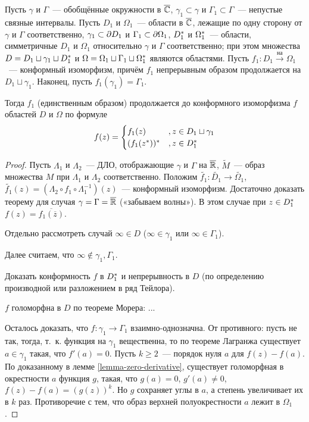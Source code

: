 \section{}
\begin{theorem}
	Пусть $\gamma$ и $\Gamma$ — обобщённые окружности в $\overline{\mathbb C}$, $\gamma_1 \subset \gamma$ и $\Gamma_1 \subset \Gamma$ — непустые связные интервалы. Пусть $D_1$ и $\Omega_1$ — области в $\overline{\mathbb C}$, лежащие по одну сторону от $\gamma$ и $\Gamma$ соответственно, $\gamma_1 \subset \partial D_1$ и $\Gamma_1 \subset \partial \Omega_1$, $D_1^*$ и $\Omega_1^*$ — области, симметричные $D_1$ и $\Omega_1$ относительно $\gamma$ и $\Gamma$ соответственно; при этом множества $D = D_1 \sqcup \gamma_1 \sqcup D_1^*$ и $\Omega = \Omega_1 \sqcup \Gamma_1 \sqcup \Omega_1^*$ являются областями. Пусть $f_1: D_1 \overset{\text{на}}{\to} \Omega_1$ — конформный изоморфизм, причём $f_1$ непрерывным образом продолжается на $D_1 \sqcup \gamma_1$. Наконец, пусть $f_1(\gamma_1) = \Gamma_1$.
	
	Тогда $f_1$ (единственным образом) продолжается до конформного изоморфизма $f$ областей $D$ и $\Omega$ по формуле
	\[ f(z) = \begin{cases}
		f_1(z)	&, z \in D_1 \sqcup \gamma_1 \\
		(f_1(z^*))^*	&, z \in D_1^*
	\end{cases} \]
\end{theorem}
\begin{proof}
	Пусть $\Lambda_1$ и $\Lambda_2$ — ДЛО, отображающие $\gamma$ и $\Gamma$ на $\overline{\mathbb R}$, $\widetilde M$ — образ множества $M$ при $\Lambda_1$ и $\Lambda_2$ соответственно. Положим $\widetilde{f_1}: \widetilde{D_1} \to \widetilde{\Omega_1}$, $\widetilde{f_1}(z) = (\Lambda_2 \circ f_1 \circ \Lambda_1^{-1})(z)$ — конформный изоморфизм. Достаточно доказать теорему для случая $\gamma = \Gamma = \overline{\mathbb R}$ («забываем волны»). В этом случае при $z \in D_1^*$ $f(z) = \overline{f_1(\overline z)}$.
	\begin{exercise}
		Отдельно рассмотреть случай $\infty \in D$ ($\infty \in \gamma_1$ или $\infty \in \Gamma_1$).
	\end{exercise}
	Далее считаем, что $\infty \notin \gamma_1, \Gamma_1$.
	\begin{exercise}
		Доказать конформность $f$ в $D_1^*$ и непрерывность в $D$ (по определению производной или разложением в ряд Тейлора).
	\end{exercise}
	$f$ голоморфна в $D$ по теореме Морера: ...

	Осталось доказать, что $f: \gamma_1 \to \Gamma_1$ взаимно-однозначна.
	От противного: пусть не так, тогда, т. к. функция на $\gamma_1$ вещественна, то по теореме Лагранжа существует $a \in \gamma_1$ такая, что $f'(a) = 0$. Пусть $k \geq 2$ — порядок нуля $a$ для $f(z) - f(a)$. По доказанному в лемме \ref{lemma-zero-derivative}, существует голоморфная в окрестности $a$ функция $g$, такая, что $g(a) = 0$,  $g'(a) \neq 0$, $f(z) - f(a) = (g(z))^k$. Но $g$ сохраняет углы в $a$, а степень увеличивает их в $k$ раз. Противоречие с тем, что образ верхней полуокрестности $a$ лежит в $\Omega_1$.
\end{proof}
